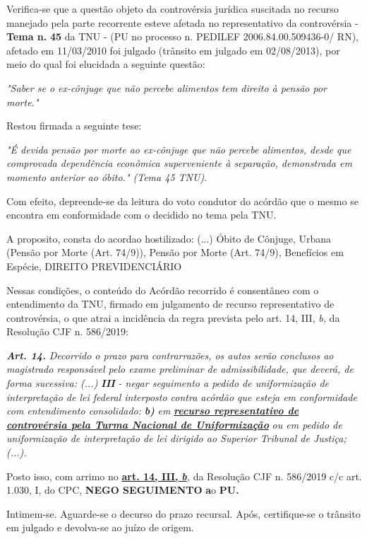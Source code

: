 \documentclass[12pt]{article}
\begin{document}
\justifying
\noindent Verifica-se que a questão objeto da controvérsia jurídica suscitada no recurso manejado pela parte recorrente esteve afetada no representativo da controvérsia - \textbf{Tema n. }\textbf{45} da TNU - (PU no processo n. PEDILEF 2006.84.00.509436-0/ RN),  afetado em 11/03/2010 foi julgado (trânsito em julgado em 02/08/2013), por meio do qual foi elucidada a seguinte questão:

\noindent \textit{"Saber se o ex-cônjuge que não percebe alimentos tem direito à pensão por morte."}

\noindent Restou firmada a seguinte tese:

\noindent \textit{"É devida pensão por morte ao ex-cônjuge que não percebe alimentos, desde que comprovada dependência econômica superveniente à separação, demonstrada em momento anterior ao óbito." (Tema 45 TNU).}

\noindent Com efeito, depreende-se da leitura do voto condutor do acórdão que o mesmo se encontra em conformidade com o decidido no  tema pela TNU.

\noindent A proposito, consta do acordao hostilizado: (...) Óbito de Cônjuge, Urbana (Pensão por Morte (Art. 74/9)), Pensão por Morte (Art. 74/9), Benefícios em Espécie, DIREITO PREVIDENCIÁRIO

\noindent Nessas condições, o conteúdo do Acórdão recorrido é consentâneo com o entendimento da TNU, firmado em julgamento de recurso representativo de controvérsia, o que atrai a incidência da regra prevista pelo art. 14, III, \textit{b,} da Resolução CJF n. 586/2019:

\noindent \textit{\textbf{Art. 14.}}\textit{ Decorrido o prazo para contrarrazões, os autos serão conclusos ao magistrado responsável pelo exame preliminar de admissibilidade, que deverá, de forma sucessiva: (...) }\textit{\textbf{III }}\textit{- negar seguimento a pedido de uniformização de interpretação de lei federal interposto contra acórdão que esteja em conformidade com entendimento consolidado: }\textit{\textbf{b)}}\textit{ em }\uline{\textit{\textbf{recurso representativo de controvérsia pela Turma Nacional de Uniformização}}}\textit{ ou em pedido de uniformização de interpretação de lei dirigido ao Superior Tribunal de Justiça;(...).}

\noindent Posto isso, com arrimo no \uline{\textbf{art. 14, III, }}\uline{\textit{\textbf{b}}}\textit{,} da Resolução CJF n. 586/2019 c/c art. 1.030, I, do CPC, \textbf{NEGO SEGUIMENTO }\textbf{a}o\textbf{ PU}\textbf{.}

\noindent Intimem-se. Aguarde-se o decurso do prazo recursal. Após, certifique-se o trânsito em julgado e devolva-se ao juízo de origem.
\end{document}
